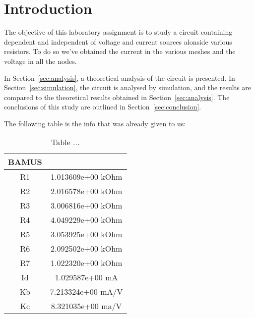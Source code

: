 \newpage
\section{Introduction}
\label{sec:introduction}

The objective of this laboratory assignment is to study a circuit containing dependent and independent of voltage and current sources alonside various resistors. To do so we've obtained the current in the various meshes and the voltage in all the nodes.

In Section~\ref{sec:analysis}, a theoretical analysis of the circuit is
presented. In Section~\ref{sec:simulation}, the circuit is analysed by
simulation, and the results are compared to the theoretical results obtained in
Section~\ref{sec:analysis}. The conclusions of this study are outlined in
Section~\ref{sec:conclusion}. 

The following table is the info that was already given to us:

\begin{table}
\centering
\begin{tabular}{c|c} 
 \hline
 BAMUS\\ [0.5ex] 
 \hline\hline
R1 & 1.013609e+00 kOhm\\ \hline
R2 & 2.016578e+00 kOhm\\ \hline
R3 & 3.006816e+00 kOhm\\ \hline
R4 & 4.049229e+00 kOhm\\ \hline
R5 & 3.053925e+00 kOhm\\ \hline
R6 & 2.092502e+00 kOhm\\ \hline
R7 & 1.022320e+00 kOhm\\ \hline
Id & 1.029587e+00 mA\\ \hline
Kb & 7.213324e+00 mA/V\\ \hline
Kc & 8.321035e+00 ma/V\\ \hline [1ex] 
\end{tabular}
\caption{Table ...}
\label{table:1}
\end{table}




